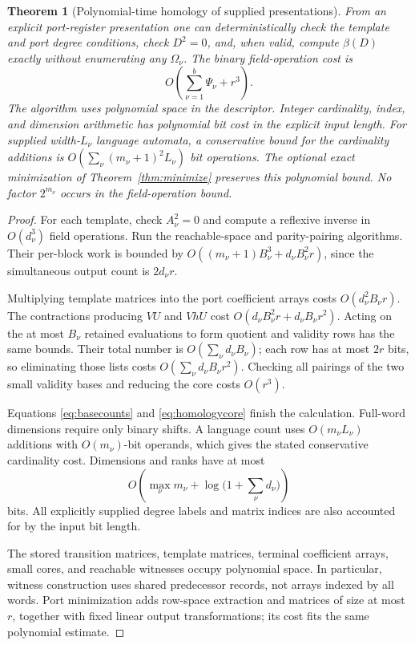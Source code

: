 \documentclass[11pt,letterpaper]{article}
\newtheorem{theorem}{Theorem}[section]
\theoremstyle{definition}
\theoremstyle{remark}
\numberwithin{equation}{section}
\begin{document}
\begin{theorem}[Polynomial-time homology of supplied presentations]
\label{thm:main}
From an explicit port-register presentation one can deterministically
check the template and port degree conditions, check $D^2=0$, and, when
valid, compute $\beta(D)$ exactly without enumerating any $\Omega_\nu$.
The binary field-operation cost is
\begin{equation}
 O\!\left(\sum_{\nu=1}^{b}\Psi_\nu+r^3\right).
 \label{eq:maincost}
\end{equation}
The algorithm uses polynomial space in the descriptor. Integer
cardinality, index, and dimension arithmetic has polynomial bit cost in
the explicit input length. For supplied width-$L_\nu$ language automata,
a conservative bound for the cardinality additions is
$O(\sum_\nu(m_\nu+1)^2L_\nu)$ bit operations.
The optional exact minimization of Theorem~\ref{thm:minimize} preserves
this polynomial bound. No factor $2^{m_\nu}$ occurs in the field-operation
bound.
\end{theorem}
\begin{proof}
For each template, check $A_\nu^2=0$ and compute a reflexive inverse in
$O(d_\nu^3)$ field operations. Run the reachable-space and parity-pairing
algorithms. Their per-block work is bounded by
$O((m_\nu+1)B_\nu^3+d_\nu B_\nu^2r)$, since the simultaneous output
count is $2d_\nu r$.

Multiplying template matrices into the port coefficient arrays costs
$O(d_\nu^2B_\nu r)$. The contractions producing $VU$ and $VhU$ cost
$O(d_\nu B_\nu^2r+d_\nu B_\nu r^2)$. Acting on the at most $B_\nu$
retained evaluations to form quotient and validity rows has the same
bounds. Their total number is $O(\sum_\nu d_\nu B_\nu)$; each row has
at most $2r$ bits, so eliminating those lists costs
$O(\sum_\nu d_\nu B_\nu r^2)$. Checking all pairings of the two small
validity bases and reducing the core costs $O(r^3)$.

Equations \eqref{eq:basecounts} and \eqref{eq:homologycore} finish the
calculation. Full-word dimensions require only binary shifts. A language
count uses $O(m_\nu L_\nu)$ additions with $O(m_\nu)$-bit operands,
which gives the stated conservative cardinality cost. Dimensions and
ranks have at most
\[
 O\!\left(\max_\nu m_\nu+\log\bigl(1+\sum_\nu d_\nu\bigr)\right)
\]
bits. All explicitly supplied degree labels and matrix indices are also
accounted for by the input bit length.

The stored transition matrices, template matrices, terminal coefficient
arrays, small cores, and reachable witnesses occupy polynomial space.
In particular, witness construction uses shared predecessor records,
not arrays indexed by all words. Port minimization adds row-space
extraction and matrices of size at most $r$, together with fixed linear
output transformations; its cost fits the same polynomial estimate.
\end{proof}
\end{document}

